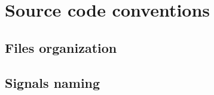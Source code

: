\chapter{Source code conventions}
\label{appendix1}

\section{Files organization}
\section{Signals naming}


